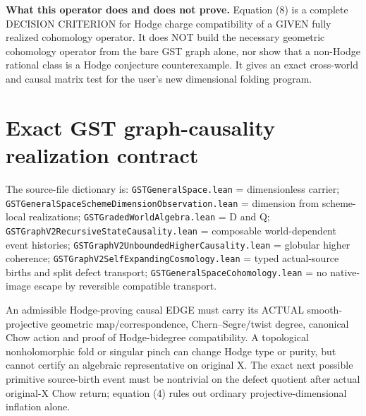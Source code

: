 \documentclass[11pt]{article}
\begin{document}
\noindent\textbf{What this operator does and does not prove.}
Equation (8)
is a complete
DECISION
CRITERION
for Hodge
charge
compatibility
of a GIVEN
fully realized
cohomology
operator.
It does
NOT build
the necessary
geometric
cohomology
operator
from
the bare
GST graph
alone, nor
show that
a non-Hodge
rational
class is
a Hodge
conjecture
counterexample.
It gives
an exact
cross-world
and causal
matrix
test for
the user's
new
dimensional
folding
program.

\section{Exact GST graph-causality realization contract}
The source-file dictionary is:
\texttt{GSTGeneralSpace.lean} = dimensionless carrier;
\texttt{GSTGeneralSpaceSchemeDimensionObservation.lean}
= dimension from scheme-local realizations;
\texttt{GSTGradedWorldAlgebra.lean} = D and Q;
\texttt{GSTGraphV2RecursiveStateCausality.lean}
= composable world-dependent event histories;
\texttt{GSTGraphV2UnboundedHigherCausality.lean}
= globular higher coherence;
\texttt{GSTGraphV2SelfExpandingCosmology.lean}
= typed actual-source births and split defect transport;
\texttt{GSTGeneralSpaceCohomology.lean}
= no native-image escape by reversible compatible transport.

An admissible Hodge-proving causal EDGE must carry
its ACTUAL smooth-projective geometric map/correspondence,
Chern--Segre/twist degree, canonical Chow action and
proof of Hodge-bidegree compatibility.
A topological nonholomorphic fold or singular pinch
can change Hodge type or purity, but cannot certify
an algebraic representative on original X.
The exact next possible primitive source-birth event
must be nontrivial on the defect quotient after
actual original-X Chow return; equation (4)
rules out ordinary projective-dimensional inflation alone.
\end{document}

